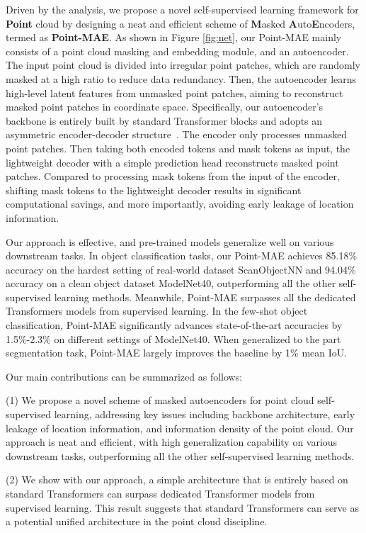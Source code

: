 \documentclass[runningheads]{llncs}
\begin{document}
Driven by the analysis, we propose a novel self-supervised learning framework for \textbf{Point} cloud by
designing a neat and efficient scheme of \textbf{M}asked \textbf{A}uto\textbf{E}ncoders, termed as \textbf{Point-MAE}. As shown in Figure \ref{fig:net}, our Point-MAE mainly consists of a point cloud masking and embedding module, and an autoencoder. The input point cloud is divided into irregular point patches, which are randomly masked at a high ratio to reduce data redundancy. Then, the autoencoder learns high-level latent features from unmasked point patches, aiming to reconstruct masked point patches in coordinate space. Specifically, our autoencoder's backbone is entirely built by standard Transformer blocks and adopts an asymmetric encoder-decoder structure~\cite{mae}. The encoder only processes unmasked point patches. Then taking both encoded tokens and mask tokens as input, the lightweight decoder with a simple prediction head reconstructs masked point patches. Compared to processing mask tokens from the input of the encoder, shifting mask tokens to the lightweight decoder results in significant computational savings, and more importantly, avoiding early leakage of location information.

Our approach is effective, and pre-trained models generalize well on various downstream tasks. In object classification tasks, our Point-MAE achieves 85.18\% accuracy on the hardest setting of real-world dataset ScanObjectNN and 94.04\% accuracy on a clean object dataset ModelNet40, outperforming all the other self-supervised learning methods. Meanwhile, Point-MAE surpasses all the dedicated Transformers models from supervised learning. In the few-shot object classification, Point-MAE significantly advances state-of-the-art accuracies by 1.5\%-2.3\% on different settings of ModelNet40. When generalized to the part segmentation task, Point-MAE largely improves the baseline by 1\% mean IoU.

Our main contributions can be summarized as follows: 

(1) We propose a novel scheme of masked autoencoders for point cloud self-supervised learning, addressing key issues including backbone architecture, early leakage of location information, and information density of the point cloud. Our approach is neat and efficient, with high generalization capability on various downstream tasks, outperforming all the other self-supervised learning methods. 

(2) We show with our approach, a simple architecture that is entirely based on standard Transformers can surpass dedicated Transformer models from supervised learning. This result suggests that standard Transformers can serve as a potential unified architecture in the point cloud discipline.  
\end{document}
